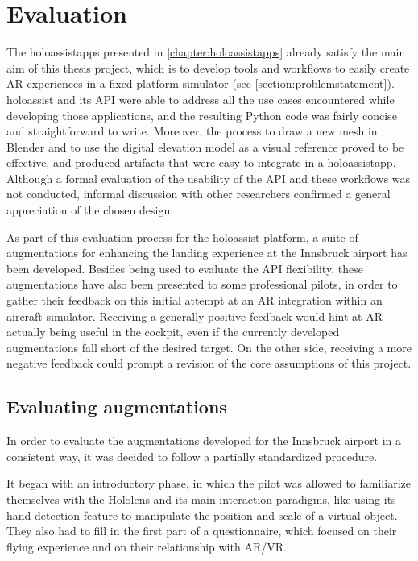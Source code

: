 
\chapter{Evaluation}\label{chapter:evaluation}

The \glspl{holoassistapp} presented in \autoref{chapter:holoassistapps} already satisfy the main aim of this thesis project, which is to develop tools and workflows to easily create \gls{AR} experiences in a fixed-platform simulator (see \autoref{section:problemstatement}). \gls{holoassist} and its \gls{API} were able to address all the use cases encountered while developing those applications, and the resulting Python code was fairly concise and straightforward to write. Moreover, the process to draw a new mesh in Blender and to use the digital elevation model as a visual reference proved to be effective, and produced artifacts that were easy to integrate in a \gls{holoassistapp}. Although a formal evaluation of the usability of the \gls{API} and these workflows was not conducted, informal discussion with other researchers confirmed a general appreciation of the chosen design.

As part of this evaluation process for the \gls{holoassist} platform, a suite of augmentations for enhancing the landing experience at the Innsbruck airport has been developed. Besides being used to evaluate the \gls{API} flexibility, these augmentations have also been presented to some professional pilots, in order to gather their feedback on this initial attempt at an \gls{AR} integration within an aircraft simulator. Receiving a generally positive feedback would hint at \gls{AR} actually being useful in the cockpit, even if the currently developed augmentations fall short of the desired target. On the other side, receiving a more negative feedback could prompt a revision of the core assumptions of this project.

\section{Evaluating augmentations}\label{sect:evaluating_augmentations}

In order to evaluate the augmentations developed for the Innsbruck airport in a consistent way, it was decided to follow a partially standardized procedure.

It began with an introductory phase, in which the pilot was allowed to familiarize themselves with the Hololens and its main interaction paradigms, like using its hand detection feature to manipulate the position and scale of a virtual object. They also had to fill in the first part of a questionnaire, which focused on their flying experience and on their relationship with \gls{AR}/\gls{VR}.

